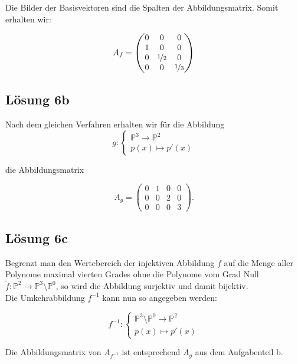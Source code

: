\documentclass[main.tex]{subfiles}
\begin{document}
Die Bilder der Basisvektoren sind die Spalten der Abbildungsmatrix. Somit erhalten wir:

$$
    A_f = \begin{pmatrix}
        0 & 0 & 0 \\
        1 & 0 & 0 \\
        0 & \nicefrac{1}{2} & 0 \\
        0 & 0 & \nicefrac{1}{3}
    \end{pmatrix}
$$

\subsection{Lösung 6b}
Nach dem gleichen Verfahren erhalten wir für die Abbildung
$$
    g : \begin{cases}
        \mathbb{P}^3 \to \mathbb{P}^2\\
        p(x) \mapsto p'(x)
    \end{cases}
$$

die Abbildungsmatrix

$$
    A_g = \begin{pmatrix}
        0 & 1 & 0 & 0 \\
        0 & 0 & 2 & 0 \\
        0 & 0 & 0 & 3
    \end{pmatrix}.
$$

\subsection{Lösung 6c}

Begrenzt man den Wertebereich der injektiven Abbildung $f$ auf die Menge aller Polynome maximal vierten Grades ohne die Polynome vom Grad Null
$\tilde{f}:\mathbb{P}^2 \to \mathbb{P}^3\setminus \mathbb{P}^0$,
so wird die Abbildung surjektiv und damit bijektiv.\\

Die Umkehrabbildung $f^{-1}$ kann nun so angegeben werden:

$$
    f^{-1} : \begin{cases}
        \mathbb{P}^3 \setminus \mathbb{P}^0 \to \mathbb{P}^2\\
        p(x) \mapsto p'(x)
    \end{cases}
$$

Die Abbildungsmatrix von $A_{f^{-1}}$ ist entsprechend $A_g$ aus dem Aufgabenteil b. 
\end{document}
